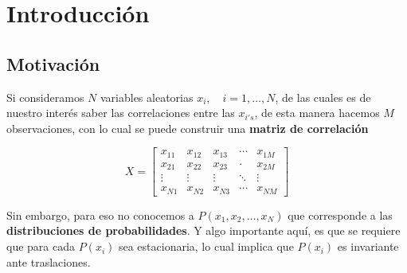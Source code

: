 \chapter*{Introducción}
\label{cap:intro}

\section{Motivación}

Si consideramos $N$ variables aleatorias $x_i, \quad i = 1,\dots, N$, de las cuales es de nuestro interés saber las correlaciones entre las $x_{i's}$, de esta manera hacemos $M$ observaciones, con lo cual se puede construir una \textbf{matriz de correlación}

\begin{equation}
   X = 
    \begin{bmatrix}
        x_{11} & x_{12} & x_{13}& \cdots & x_{1M}\\
        x_{21} & x_{22} & x_{23}& \cdot & x_{2M}\\
        \vdots & \vdots & \vdots & \ddots & \vdots\\
        x_{N1} & x_{N2} & x_{N3} & \cdots & x_{NM}
    \end{bmatrix}
\end{equation}

Sin embargo, para eso no conocemos a $P(x_1,x_2,\dots, x_N)$ que corresponde a las \textbf{distribuciones de probabilidades}. Y algo importante aquí, es que se requiere que para cada $P(x_i)$ sea estacionaria, lo cual implica que $P(x_i)$ es invariante ante traslaciones.
